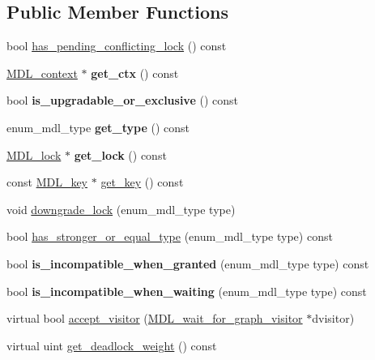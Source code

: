 \subsection*{Public Member Functions}
\begin{DoxyCompactItemize}
\item 
bool \mbox{\hyperlink{classMDL__ticket_a453c69eade5322291a6b3df6833892d5}{has\+\_\+pending\+\_\+conflicting\+\_\+lock}} () const
\item 
\mbox{\label{classMDL__ticket_a2b0c1bd15feca45b1b67791de5a3a027}} 
\mbox{\hyperlink{classMDL__context}{M\+D\+L\+\_\+context}} $\ast$ {\bfseries get\+\_\+ctx} () const
\item 
\mbox{\label{classMDL__ticket_a8dd08e1eb3ca1bd5842cdb028bcfc5cd}} 
bool {\bfseries is\+\_\+upgradable\+\_\+or\+\_\+exclusive} () const
\item 
\mbox{\label{classMDL__ticket_ad87cffc63ead6571484ac6f142f0b19f}} 
enum\+\_\+mdl\+\_\+type {\bfseries get\+\_\+type} () const
\item 
\mbox{\label{classMDL__ticket_aeb8547f86d05a1eb3990834edc7af9a0}} 
\mbox{\hyperlink{classMDL__lock}{M\+D\+L\+\_\+lock}} $\ast$ {\bfseries get\+\_\+lock} () const
\item 
const \mbox{\hyperlink{structMDL__key}{M\+D\+L\+\_\+key}} $\ast$ \mbox{\hyperlink{classMDL__ticket_ada5b318a2cce4e1daccf7b69b0e19284}{get\+\_\+key}} () const
\item 
void \mbox{\hyperlink{classMDL__ticket_a4fd3f255fe828cbf0d95a5d02d70d302}{downgrade\+\_\+lock}} (enum\+\_\+mdl\+\_\+type type)
\item 
bool \mbox{\hyperlink{classMDL__ticket_a3db14474f09df6e82fe7db48cc4463df}{has\+\_\+stronger\+\_\+or\+\_\+equal\+\_\+type}} (enum\+\_\+mdl\+\_\+type type) const
\item 
\mbox{\label{classMDL__ticket_a7bdbcd1e0281b6ebfe11d6e132cc9e4f}} 
bool {\bfseries is\+\_\+incompatible\+\_\+when\+\_\+granted} (enum\+\_\+mdl\+\_\+type type) const
\item 
\mbox{\label{classMDL__ticket_a6ee3c2a726b128b58ef8121f00970378}} 
bool {\bfseries is\+\_\+incompatible\+\_\+when\+\_\+waiting} (enum\+\_\+mdl\+\_\+type type) const
\item 
virtual bool \mbox{\hyperlink{classMDL__ticket_af1bd23371e97d8bf6b0ff9de43e7e418}{accept\+\_\+visitor}} (\mbox{\hyperlink{classMDL__wait__for__graph__visitor}{M\+D\+L\+\_\+wait\+\_\+for\+\_\+graph\+\_\+visitor}} $\ast$dvisitor)
\item 
virtual uint \mbox{\hyperlink{classMDL__ticket_a9f3cbfd4b31f7715eae746904e840a02}{get\+\_\+deadlock\+\_\+weight}} () const
\end{DoxyCompactItemize}
